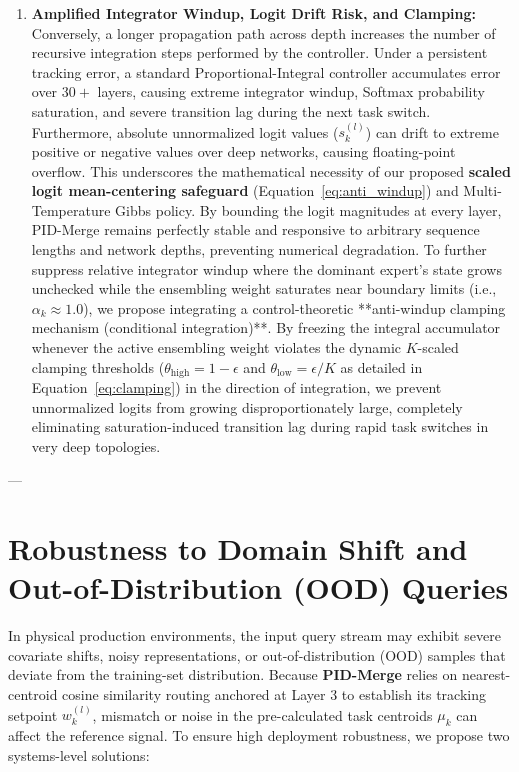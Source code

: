 \begin{enumerate}
    \item \textbf{Amplified Integrator Windup, Logit Drift Risk, and Clamping:} Conversely, a longer propagation path across depth increases the number of recursive integration steps performed by the controller. Under a persistent tracking error, a standard Proportional-Integral controller accumulates error over $30+$ layers, causing extreme integrator windup, Softmax probability saturation, and severe transition lag during the next task switch. Furthermore, absolute unnormalized logit values ($s_k^{(l)}$) can drift to extreme positive or negative values over deep networks, causing floating-point overflow. This underscores the mathematical necessity of our proposed \textbf{scaled logit mean-centering safeguard} (Equation~\ref{eq:anti_windup}) and Multi-Temperature Gibbs policy. By bounding the logit magnitudes at every layer, PID-Merge remains perfectly stable and responsive to arbitrary sequence lengths and network depths, preventing numerical degradation. To further suppress relative integrator windup where the dominant expert's state grows unchecked while the ensembling weight saturates near boundary limits (i.e., $\alpha_k \approx 1.0$), we propose integrating a control-theoretic **anti-windup clamping mechanism (conditional integration)**. By freezing the integral accumulator whenever the active ensembling weight violates the dynamic $K$-scaled clamping thresholds ($\theta_{\text{high}} = 1 - \epsilon$ and $\theta_{\text{low}} = \epsilon/K$ as detailed in Equation~\ref{eq:clamping}) in the direction of integration, we prevent unnormalized logits from growing disproportionately large, completely eliminating saturation-induced transition lag during rapid task switches in very deep topologies.
\end{enumerate}

---

\section{Robustness to Domain Shift and Out-of-Distribution (OOD) Queries}
\label{sec:appendix_robustness}

In physical production environments, the input query stream may exhibit severe covariate shifts, noisy representations, or out-of-distribution (OOD) samples that deviate from the training-set distribution. Because \textbf{PID-Merge} relies on nearest-centroid cosine similarity routing anchored at Layer 3 to establish its tracking setpoint $w_k^{(l)}$, mismatch or noise in the pre-calculated task centroids $\mu_k$ can affect the reference signal. To ensure high deployment robustness, we propose two systems-level solutions:

